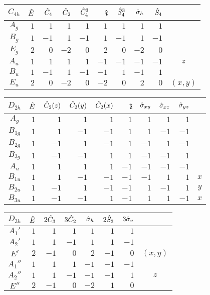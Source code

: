 \documentclass[../../Atom-ogMolekylefysik.tex]{subfiles}
\begin{document}
\onecolumn

\begin{tabular}{c|r r r r r r r r|c}
$C_{4h}$ & $\hat E$ & $\hat C_4$ & $\hat C_2$ & $\hat C_4^3$ & \textit{\^\i} & $\hat S_4^3$ & $\hat \sigma_h$ & $\hat S_4$ \\\hline
$A_g$ & $1$ & $1$ & $1$ & $1$ & $1$ & $1$ & $1$ & $1$\\
$B_g$ & $1$ & $-1$ & $1$ & $-1$ & $1$ & $-1$ & $1$ & $-1$\\
$E_g$ & $2$ & $0$ & $-2$ & $0$ & $2$ & $0$ & $-2$ & $0$\\
$A_u$ & $1$ & $1$ & $1$ & $1$ & $-1$ & $-1$ & $-1$ & $-1$ & $z$\\
$B_u$ & $1$ & $-1$ & $1$ & $-1$ & $-1$ & $1$ & $-1$ & $1$\\
$E_u$ & $2$ & $0$ & $-2$ & $0$ & $-2$ & $0$ & $2$ & $0$ & $(x,y)$\\
\end{tabular}

\vspace{1cm}

\begin{tabular}{c|r r r r r r r r|c}
$D_{2h}$ & $\hat E$ & $\hat C_2(z)$ & $\hat C_2(y)$ & $\hat C_2(x)$ & \textit{\^\i} & $\hat \sigma_{xy}$ & $\hat \sigma_{xz}$& $\hat \sigma_{yz}$\\\hline
$A_g$ & $1$ & $1$ & $1$ & $1$ & $1$ & $1$ & $1$ & $1$\\
$B_{1g}$ & $1$ & $1$ & $-1$ & $-1$ & $1$ & $1$ & $-1$ & $-1$\\
$B_{2g}$ & $1$ & $-1$ & $1$ & $-1$ & $1$ & $-1$ & $1$ & $-1$\\
$B_{3g}$ & $1$ & $-1$ & $-1$ & $1$ & $1$ & $-1$ & $-1$ & $1$\\
$A_u$ & $1$ & $1$ & $1$ & $1$ & $-1$ & $-1$ & $-1$ & $-1$\\
$B_{1u}$ & $1$ & $1$ & $-1$ & $-1$ & $-1$ & $-1$ & $1$ & $1$ & $x$\\
$B_{2u}$ & $1$ & $-1$ & $1$ & $-1$ & $-1$ & $1$ & $-1$ & $1$ & $y$\\
$B_{3u}$ & $1$ & $-1$ & $-1$ & $1$ & $-1$ & $1$ & $1$ & $-1$ & $x$\\
\end{tabular}

\vspace{1cm}

\begin{tabular}{c|r r r r r r|c}
$D_{3h}$ & $\hat E$ & $2\hat C_3$ & $3\hat C_2$ & $\hat \sigma_h$ & $2\hat S_3$ & $3\hat \sigma_v$\\\hline
$A_1'$ & $1$ & $1$ & $1$ & $1$ & $1$ & $1$\\
$A_2'$ & $1$ & $1$ & $-1$ & $1$ & $1$ & $-1$\\
$E'$ & $2$ & $-1$ & $0$ & $2$ & $-1$ & $0$ & $(x,y)$\\
$A_1''$ & $1$ & $1$ & $1$ & $-1$ & $-1$ & $-1$\\
$A_2''$ & $1$ & $1$ & $-1$ & $-1$ & $-1$ & $1$ & $z$\\
$E''$ & $2$ & $-1$ & $0$ & $-2$ & $1$ & $0$
\end{tabular}
\end{document}
